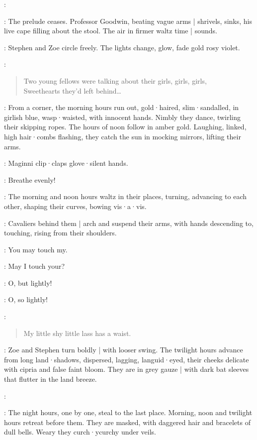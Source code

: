 \Maginni:

:
The prelude ceases.
Professor Goodwin,
beating vague arms |
shrivels,
sinks,
his live cape filling about the stool.
The air in firmer waltz time |
sounds.

:
Stephen and Zoe circle freely.
The lights change,
%
glow,
fade gold rosy violet.

\Pianola[2]:
\begin{verse}
    Two young fellows were talking about their girls, girls, girls,\\
    Sweethearts they'd left behind…
\end{verse}

:
From a corner,
the morning hours run out,
gold·haired,
slim·sandalled,
in girlish blue,
wasp·waisted,
with innocent hands.
Nimbly they dance,
twirling their skipping ropes.
The hours of noon follow in amber gold.
Laughing,
linked,
high hair·combs flashing,
they catch the sun in mocking mirrors,
lifting their arms.

:
Maginni clip·claps glove·silent hands.

\Maginni:
Breathe evenly!

:
The morning and noon hours waltz in their places,
turning,
advancing to each other,
shaping their curves,
bowing vis·a·vis.

:
Cavaliers behind them |
arch and suspend their arms,
with hands descending to,
touching,
rising from their shoulders.

\Hours:
You may touch my.

\Cavaliers:
May I touch your?

\Hours:
O,
but lightly!

\Cavaliers:
O,
so lightly!

\Pianola:
\begin{verse}
    My little shy little lass has a waist.
\end{verse}

:
Zoe and Stephen turn boldly |
with looser swing.
The twilight hours advance from long land·shadows,
dispersed,
lagging,
languid·eyed,
their cheeks delicate with cipria and false faint bloom.
They are in grey gauze |
with dark bat sleeves that flutter in the land breeze.

\Maginni[2]:

:
The night hours,
one by one,
steal to the last place.
Morning,
noon and twilight hours retreat before them.
They are masked,
with daggered hair and bracelets of dull bells.
Weary they curch·ycurchy under veils.

